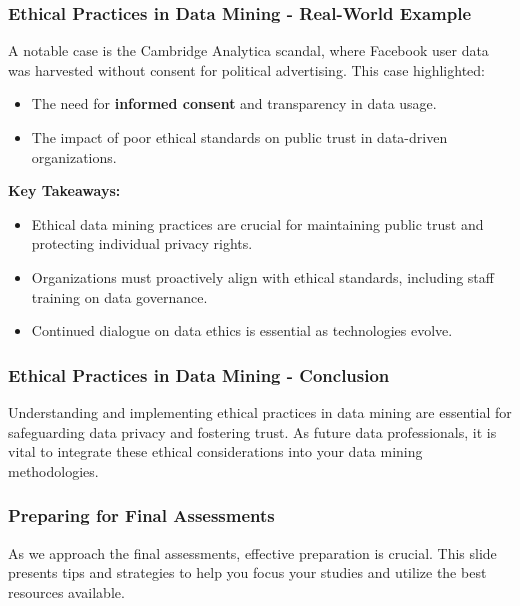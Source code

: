 \documentclass[aspectratio=169]{beamer}
\begin{document}
\begin{frame}[fragile]
    \frametitle{Ethical Practices in Data Mining - Real-World Example}
    A notable case is the Cambridge Analytica scandal, where Facebook user data was harvested without consent for political advertising. This case highlighted:
    \begin{itemize}
        \item The need for \textbf{informed consent} and transparency in data usage.
        \item The impact of poor ethical standards on public trust in data-driven organizations.
    \end{itemize}

    \textbf{Key Takeaways:}
    \begin{itemize}
        \item Ethical data mining practices are crucial for maintaining public trust and protecting individual privacy rights.
        \item Organizations must proactively align with ethical standards, including staff training on data governance.
        \item Continued dialogue on data ethics is essential as technologies evolve.
    \end{itemize}
\end{frame}

\begin{frame}[fragile]
    \frametitle{Ethical Practices in Data Mining - Conclusion}
    Understanding and implementing ethical practices in data mining are essential for safeguarding data privacy and fostering trust. As future data professionals, it is vital to integrate these ethical considerations into your data mining methodologies.
\end{frame}

\begin{frame}[fragile]
    \frametitle{Preparing for Final Assessments}
    As we approach the final assessments, effective preparation is crucial. This slide presents tips and strategies to help you focus your studies and utilize the best resources available.
\end{frame}
\end{document}
